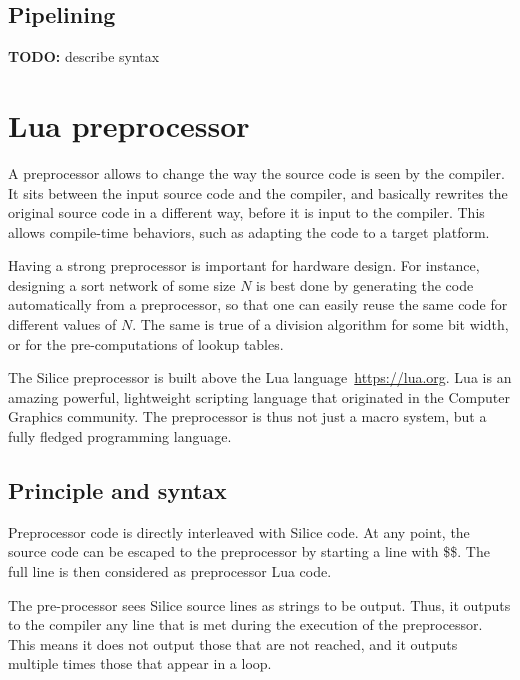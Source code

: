 \documentclass[a4]{article}
\newcommand\todo[1]{{\color{magenta}\textbf{TODO:} #1}}
\newcommand\silice{Silice}
\begin{document}

\subsection{Pipelining} 

\todo{describe syntax \ttfamily{\{ \} -> \{ \}}}


\section{Lua preprocessor}

A preprocessor allows to change the way the source code is seen by the compiler.
It sits between the input source code and the compiler, and basically rewrites the
original source code in a different way, before it is input to the compiler.
This allows compile-time behaviors, such as adapting the code to a target platform.

Having a strong preprocessor is important for hardware design. For instance,
designing a sort network of some size $N$ is best done by generating the code 
automatically from a preprocessor, so that one can easily reuse the
same code for different values of $N$. The same is true of a division 
algorithm for some bit width, or for the pre-computations of lookup tables.

The \silice{} preprocessor is built above the Lua language~\url{https://lua.org}. Lua is an amazing powerful, lightweight scripting language that originated in the Computer Graphics community. The preprocessor is thus not just a macro system, but a fully fledged programming language.

\subsection{Principle and syntax}

Preprocessor code is directly interleaved with Silice code. At any point, the source code can be escaped to the preprocessor by starting a line with \$\$. The full line is then considered as preprocessor Lua code. 

The pre-processor sees Silice source lines as strings to be output. 
Thus, it outputs to the compiler any line that is met during the execution
of the preprocessor. This means it does not output those that are not reached, and
it outputs multiple times those that appear in a loop.
\end{document}
